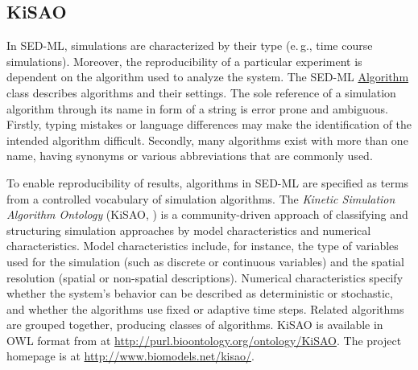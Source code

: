 \subsection{KiSAO}
\label{sec:kisao}

In SED-ML, simulations are characterized by their type (e.\,g., time course simulations). 
Moreover, the reproducibility of a particular experiment is dependent on the algorithm used to analyze the system. 
The SED-ML \hyperref[class:algorithm]{Algorithm} class describes algorithms and their settings. 
The sole reference of a simulation algorithm through its name in form of a string is error prone and ambiguous. 
Firstly, typing mistakes or language differences may make the identification of the intended algorithm difficult. 
Secondly, many algorithms exist with more than one name, having synonyms or various abbreviations that are commonly used.

To enable reproducibility of results, algorithms in SED-ML are specified as terms from a controlled vocabulary of simulation algorithms. 
The \emph{Kinetic Simulation Algorithm Ontology} (KiSAO, \citep{CWK+10}) is a community-driven approach of classifying and structuring simulation approaches by model characteristics and numerical characteristics.  Model characteristics include, for instance, the type of variables used for the simulation (such as discrete or continuous variables) and the spatial resolution (spatial or non-spatial descriptions). Numerical characteristics specify whether the system's behavior can be described as deterministic or stochastic, and whether the algorithms use fixed or adaptive time steps.  
Related algorithms are grouped together, producing classes of algorithms.
KiSAO is available in OWL format from  at \url{http://purl.bioontology.org/ontology/KiSAO}. 
The project homepage is at \url{http://www.biomodels.net/kisao/}.


%
%



